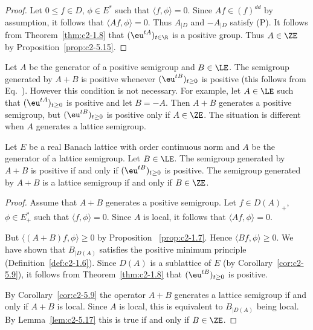 \begin{proof}
Let $0 \leq f \in D$, $\phi \in E^*$ such that $\langle f,\phi \rangle = 0$.
Since $Af \in (f)^{dd}$ by assumption, it follows that $\langle Af,\phi \rangle = 0$.
Thus $A_{\vert D }$ and $-A_{\vert D}$ satisfy (P).
It follows from Theorem~\ref{thm:c2-1.8}    that $(\eu^{tA})_{t \in \R}$ is a positive group.
Thus $A \in \ZE$ by  Proposition~\ref{prop:c2-5.15}.
\end{proof}
Let $A$ be the generator of a positive semigroup and $B \in \LE$. 
The semigroup generated by $A + B$ is positive whenever $(\eu^{tB})_{t \geq 0}$ is positive (this follows from Eq.~).
However this condition is not necessary. 
For example, let $A \in \LE$ such that $(\eu^{tA})_{t \geq 0}$ is positive and let $B = -A$.
Then $A + B$ generates a positive semigroup, but $(\eu^{tB})_{t \geq 0}$ is positive only if\/ $A \in \ZE$.
The situation is different when $A$ generates a lattice semigroup.
\begin{theorem}\label{thm:c2-5.18}
Let $E$ be a real Banach lattice with order continuous norm and $A$ be the generator of a lattice semigroup.
Let $B \in \LE$.
The semigroup generated by $A + B$ is positive if and only if\/ $(\eu^{tB})_{t \geq 0}$ is positive.
The semigroup generated by $A + B$ is a lattice semigroup if and only if\/ $B \in \ZE$.
\end{theorem}

\begin{proof}
Assume that $A + B$ generates a positive semigroup.
Let $f \in D(A)_{+}$, $\phi \in E_{+}^*$ such that $\langle f,\phi \rangle = 0$.
Since $A$ is local, it follows that $\langle Af,\phi \rangle = 0$.

But $\langle (A+B)f,\phi \rangle \geq 0$ by  Proposition ~\ref{prop:c2-1.7}.
Hence $\langle Bf,\phi \rangle \geq 0$.
We have shown that $B_{\vert D(A)}$ satisfies the positive minimum principle (Definition~\ref{def:c2-1.6}).
Since $D(A)$ is a sublattice of\/ $E$ (by Corollary~\ref{cor:c2-5.9}), it follows from Theorem~\ref{thm:c2-1.8}   that $(\eu^{tB})_{t \geq 0}$ is positive.

By Corollary~\ref{cor:c2-5.9} the operator $A + B$ generates a lattice semigroup if and only if\/ $A + B$ is local.
Since $A$ is local, this is equivalent to $B_{\vert D(A)}$ being local.
By Lemma~\ref{lem:c2-5.17} this is true if and only if\/ $B \in \ZE$.
\end{proof}

